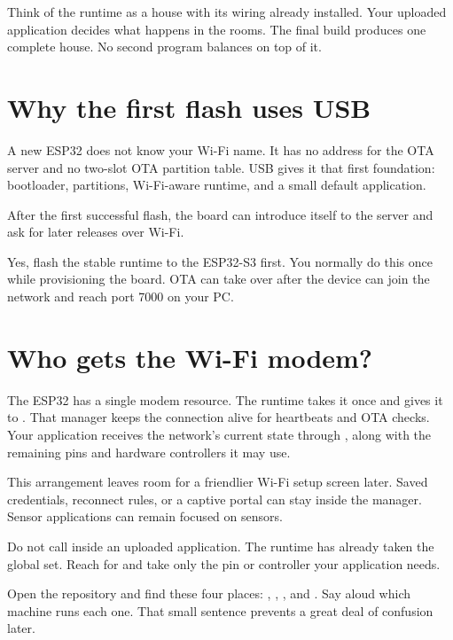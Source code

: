 Think of the runtime as a house with its wiring already installed. Your uploaded application decides what happens in the rooms. The final build produces one complete house. No second program balances on top of it.

\section{Why the first flash uses USB}

A new ESP32 does not know your Wi-Fi name. It has no address for the OTA server and no two-slot OTA partition table. USB gives it that first foundation: bootloader, partitions, Wi-Fi-aware runtime, and a small default application.

After the first successful flash, the board can introduce itself to the server and ask for later releases over Wi-Fi.

\begin{mentorbox}
Yes, flash the stable runtime to the ESP32-S3 first. You normally do this once while provisioning the board. OTA can take over after the device can join the network and reach port 7000 on your PC.
\end{mentorbox}

\section{Who gets the Wi-Fi modem?}

The ESP32 has a single modem resource. The runtime takes it once and gives it to . That manager keeps the connection alive for heartbeats and OTA checks. Your application receives the network's current state through , along with the remaining pins and hardware controllers it may use.

This arrangement leaves room for a friendlier Wi-Fi setup screen later. Saved credentials, reconnect rules, or a captive portal can stay inside the manager. Sensor applications can remain focused on sensors.

\begin{warningbox}
Do not call  inside an uploaded application. The runtime has already taken the global set. Reach for  and take only the pin or controller your application needs.
\end{warningbox}

\begin{checkpoint}
Open the repository and find these four places: , , , and . Say aloud which machine runs each one. That small sentence prevents a great deal of confusion later.
\end{checkpoint}
